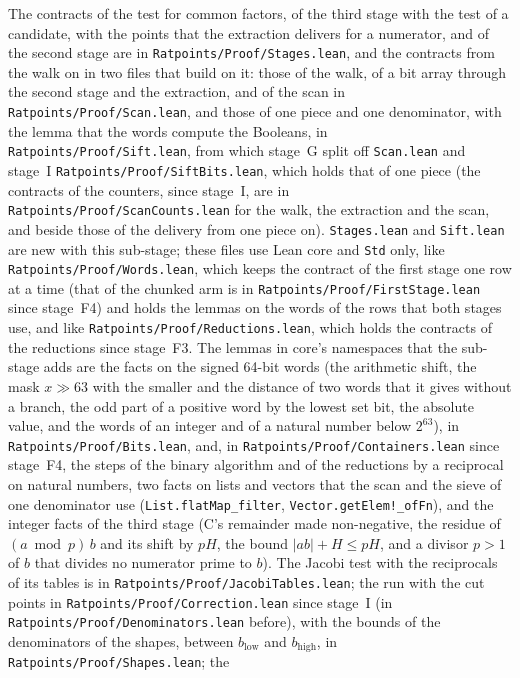 The contracts of the test for common factors, of the third stage with the test of a candidate, with
the points that the extraction delivers for a numerator, and of the second stage are in
\verb|Ratpoints/Proof/Stages.lean|, and the contracts from the walk on in two files that build on
it: those of the walk, of a bit array through the second stage and the extraction, and of the scan
in \verb|Ratpoints/Proof/Scan.lean|, and those of one piece and one denominator, with the lemma that
the words compute the Booleans, in \verb|Ratpoints/Proof/Sift.lean|, from which stage~G split off
\verb|Scan.lean| and stage~I \verb|Ratpoints/Proof/SiftBits.lean|, which holds that of one piece
(the contracts of the counters, since stage~I, are in \verb|Ratpoints/Proof/ScanCounts.lean| for the
walk, the extraction and the scan, and beside those of the delivery from one piece on).
\verb|Stages.lean| and \verb|Sift.lean| are new with this sub-stage; these files use Lean core and
\verb|Std| only, like \verb|Ratpoints/Proof/Words.lean|, which keeps the contract of the first stage
one row at a time (that of the chunked arm is in \verb|Ratpoints/Proof/FirstStage.lean| since
stage~F4) and holds the lemmas on the words of the rows that both stages use, and like
\verb|Ratpoints/Proof/Reductions.lean|, which holds the contracts of the reductions since stage~F3.
The lemmas in core's namespaces that the sub-stage adds are the facts on the signed 64-bit words
(the arithmetic shift, the mask $x \gg 63$ with the smaller and the distance of two words that it
gives without a branch, the odd part of a positive word by the lowest set bit, the absolute value,
and the words of an integer and of a natural number below $2^{63}$), in
\verb|Ratpoints/Proof/Bits.lean|, and, in \verb|Ratpoints/Proof/Containers.lean| since stage~F4, the
steps of the binary algorithm and of the reductions by a reciprocal on natural numbers, two facts on
lists and vectors that the scan and the sieve of one denominator use (\verb|List.flatMap_filter|,
\verb|Vector.getElem!_ofFn|), and the integer facts of the third stage (C's remainder made
non-negative, the residue of $(a \bmod p)\, b$ and its shift by $p H$, the bound
$|a b| + H \le p H$, and a divisor $p > 1$ of $b$ that divides no numerator prime to $b$). The
Jacobi test with the reciprocals of its tables is in \verb|Ratpoints/Proof/JacobiTables.lean|; the
run with the cut points in \verb|Ratpoints/Proof/Correction.lean| since stage~I (in
\verb|Ratpoints/Proof/Denominators.lean| before), with the bounds of the denominators of the shapes,
between $b_{\mathrm{low}}$ and $b_{\mathrm{high}}$, in \verb|Ratpoints/Proof/Shapes.lean|; the
